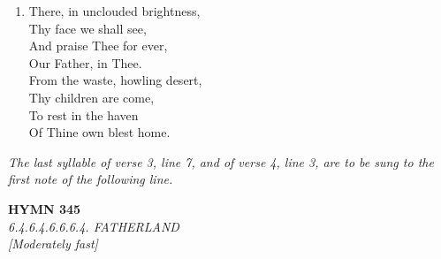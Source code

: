 \begin{enumerate}
    \item There, in unclouded brightness, \\
        Thy face we shall see, \\
        And praise Thee for ever, \\
        Our Father, in Thee. \\
        From the waste, howling desert, \\
        Thy children are come, \\
        To rest in the haven \\
        Of Thine own blest home.

\end{enumerate}
\vspace{1em}
\noindent \textit{The last syllable of verse 3, line 7, and of verse 4, line 3, are to be sung to the first note of the following line.}

\newpage
\begin{center}
    {\Large \textbf{HYMN 345}}
    \\
    \textit{6.4.6.4.6.6.6.4. FATHERLAND}
    \\
    \textit{\small [Moderately fast]}
\end{center}
\vspace{1em}

